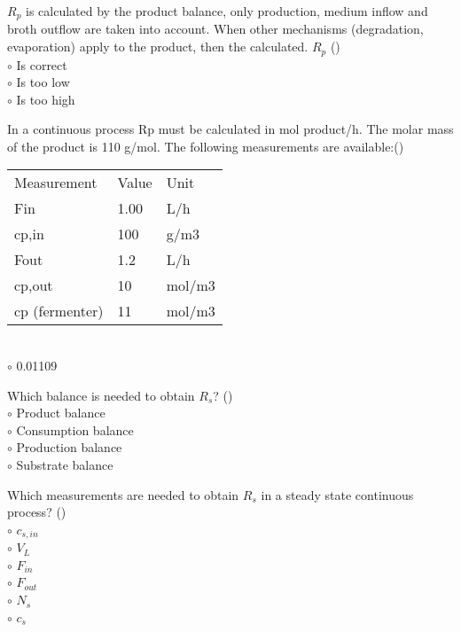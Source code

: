 \documentclass[]{beamer}
\begin{document}
\begin{frame}[shrink] {}
\addtocounter{questions}{1}
\color{blue}
$R_p$ is calculated by the product balance, only production, medium inflow and broth outflow are taken into account.
When other mechanisms (degradation, evaporation) apply to the product, then the calculated. $R_p$ ()\\
\color{black}
\setlength{\parindent}{-0.4cm}
{\color{red}$\circ$} Is correct\\
{\color{red}$\circ$} Is too low \\
{\color{red}$\circ$} Is too high \\
\end{frame}

\begin{frame}[shrink] {}
\addtocounter{questions}{1}
\color{blue}
In a continuous process Rp must be calculated in mol product/h. The molar mass of the product is 110 g/mol. The following measurements are available:({})\\[0.3em]
\color{gray}
\begin{tabular}[]{l l l}
Measurement & Value & Unit\\
Fin & 1.00 & L/h\\
cp,in& 	100& 	g/m3\\
Fout& 	1.2& 	L/h\\
cp,out&  	10 & 	mol/m3\\
cp (fermenter) & 11 & 	mol/m3\\
\end{tabular}\\[0.3em]
\color{black}
\setlength{\parindent}{-0.4cm}
{\color{red}$\circ$} 0.01109
 
\end{frame}

\begin{frame}[shrink] {}
\addtocounter{questions}{1}
\color{blue}
Which balance is needed to obtain $R_s$? ()\\[0.3em]
\color{black}
\setlength{\parindent}{-0.4cm}
{\color{red}$\circ$}  Product balance  \\
{\color{red}$\circ$} Consumption balance\\
{\color{red}$\circ$} Production balance \\
{\color{red}$\circ$} Substrate balance 
\end{frame}

\begin{frame}[shrink] {}
\addtocounter{questions}{1}
\color{blue}
Which measurements are needed to obtain $R_s$ in a steady state continuous process?  ()\\
\color{black}
\setlength{\parindent}{-0.4cm}
{\color{red}$\circ$}  $c_{s,in}$\\
{\color{red}$\circ$} $V_L$\\
{\color{red}$\circ$} $F_{in}$\\
{\color{red}$\circ$} $F_{out}$\\
{\color{red}$\circ$} $N_s$\\
{\color{red}$\circ$} $c_s$
\end{frame}
\end{document}
